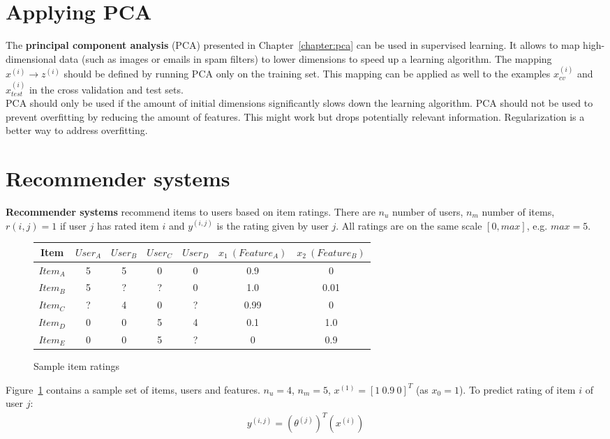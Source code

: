 \documentclass{report}
\begin{document}
\section{Applying PCA}
The {\bf principal component analysis} (PCA) presented in Chapter~\ref{chapter:pca} can be used in supervised learning.
It allows to map high-dimensional data (such as images or emails in spam filters) to lower dimensions to speed up a learning algorithm.
The mapping $x^{(i)}\rightarrow z^{(i)}$ should be defined by running PCA only on the training set.
This mapping can be applied as well to the examples $x^{(i)}_{cv}$ and $x^{(i)}_{test}$ in the cross validation and test sets. \\

PCA should only be used if the amount of initial dimensions significantly slows down the learning algorithm. PCA should not be used to prevent overfitting by reducing the amount of features. This might work but drops potentially relevant information. Regularization is a better way to address overfitting.


\section{Recommender systems}
{\bf Recommender systems} recommend items to users based on item ratings. There are $n_u$ number of users, $n_m$ number of items, $r(i,j)=1$ if user $j$ has rated item $i$ and $y^{(i,j)}$ is the rating given by user $j$. All ratings are on the same scale $[0,max]$, e.g. $max=5$.

\begin{figure}[h!]
\centering
\begin{tabular}{c||cccc||cc}
Item & $User_A$ & $User_B$ & $User_C$ & $User_D$ & $x_1\:(Feature_A)$ & $x_2\:(Feature_B)$ \\
\hline
\hline
$Item_A$ & 5 & 5 & 0 & 0 & 0.9 & 0 \\
$Item_B$ & 5 & ? & ? & 0 & 1.0 & 0.01 \\
$Item_C$ & ? & 4 & 0 & ? & 0.99 & 0 \\
$Item_D$ & 0 & 0 & 5 & 4 & 0.1 &1.0 \\
$Item_E$ & 0 & 0 & 5 & ? & 0 & 0.9 \\
\end{tabular}
\caption{Sample item ratings}
\label{ref:sampleitemratings}
\end{figure}

Figure~\ref{ref:sampleitemratings} contains a sample set of items, users and features. $n_u=4$, $n_m=5$, $x^{(1)}= [1\:0.9\:0]^T$ (as $x_0=1$). To predict rating of item $i$ of user $j$:
\begin{align*}
y^{(i,j)}=(\theta^{(j)})^T(x^{(i)})
\end{align*}
\end{document}
